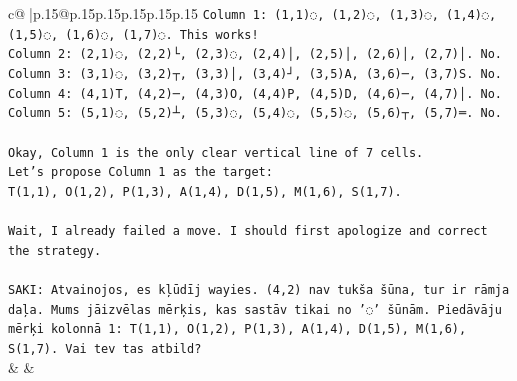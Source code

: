 \documentclass{article}
\begin{document}
{\begin{supertabular}{c@{$\;$}|p{.15\linewidth}@{}p{.15\linewidth}p{.15\linewidth}p{.15\linewidth}p{.15\linewidth}p{.15\linewidth}}
{{{\texttt{Column 1: (1,1)◌, (1,2)◌, (1,3)◌, (1,4)◌, (1,5)◌, (1,6)◌, (1,7)◌. This works!} \\
\texttt{Column 2: (2,1)◌, (2,2)└, (2,3)◌, (2,4)│, (2,5)│, (2,6)│, (2,7)│. No.} \\
\texttt{Column 3: (3,1)◌, (3,2)┬, (3,3)│, (3,4)┘, (3,5)A, (3,6)─, (3,7)S. No.} \\
\texttt{Column 4: (4,1)T, (4,2)─, (4,3)O, (4,4)P, (4,5)D, (4,6)─, (4,7)│. No.} \\
\texttt{Column 5: (5,1)◌, (5,2)┴, (5,3)◌, (5,4)◌, (5,5)◌, (5,6)┬, (5,7)═. No.} \\
\\ 
\texttt{Okay, Column 1 is the only clear vertical line of 7 cells.} \\
\texttt{Let's propose Column 1 as the target:} \\
\texttt{T(1,1), O(1,2), P(1,3), A(1,4), D(1,5), M(1,6), S(1,7).} \\
\\ 
\texttt{Wait, I already failed a move. I should first apologize and correct the strategy.} \\
\\ 
\texttt{SAKI: Atvainojos, es kļūdīj wayies. (4,2) nav tukša šūna, tur ir rāmja daļa. Mums jāizvēlas mērķis, kas sastāv tikai no '◌' šūnām. Piedāvāju mērķi kolonnā 1: T(1,1), O(1,2), P(1,3), A(1,4), D(1,5), M(1,6), S(1,7). Vai tev tas atbild?} \\
            }
        }
    }
    & & \\ \\


\end{supertabular}}
\end{document}
